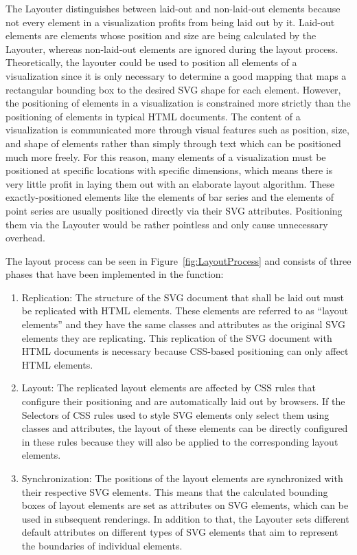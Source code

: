 The Layouter distinguishes between laid-out and non-laid-out elements because not every element in a visualization profits from being laid out by it. 
Laid-out elements are elements whose position and size are being calculated by the Layouter, whereas non-laid-out elements are ignored during the layout process. 
Theoretically, the layouter could be used to position all elements of a visualization since it is only necessary to determine a good mapping that maps a rectangular bounding box to the desired SVG shape for each element.
However, the positioning of elements in a visualization is constrained more strictly than the positioning of elements in typical HTML documents.
The content of a visualization is communicated more through visual features such as position, size, and shape of elements rather than simply through text which can be positioned much more freely.  
For this reason, many elements of a visualization must be positioned at specific locations with specific dimensions, which means there is very little profit in laying them out with an elaborate layout algorithm.
These exactly-positioned elements like the  elements of bar series and the  elements of point series are usually positioned directly via their SVG attributes.
Positioning them via the Layouter would be rather pointless and only cause unnecessary overhead.

The layout process can be seen in Figure~\ref{fig:LayoutProcess} and consists of three phases that have been implemented in the  function:
\begin{enumerate}
\item Replication:
The structure of the SVG document that shall be laid out must be replicated with HTML  elements. These elements are referred to as \enquote{layout elements} and they have the same classes and  attributes as the original SVG elements they are replicating.
This replication of the SVG document with HTML documents is necessary because CSS-based positioning can only affect HTML elements.

\item Layout:
The replicated layout elements are affected by CSS rules that configure their positioning and are automatically laid out by browsers. 
If the Selectors of CSS rules used to style SVG elements only select them using classes and  attributes, the layout of these elements can be directly configured in these rules because they will also be applied to the corresponding layout elements.

\item Synchronization:
The positions of the layout elements are synchronized with their respective SVG elements.
This means that the calculated bounding boxes of layout elements are set as  attributes on SVG elements, which can be used in subsequent renderings.
In addition to that, the Layouter sets different default attributes on different types of SVG elements that aim to represent the boundaries of individual elements.
\end{enumerate}

